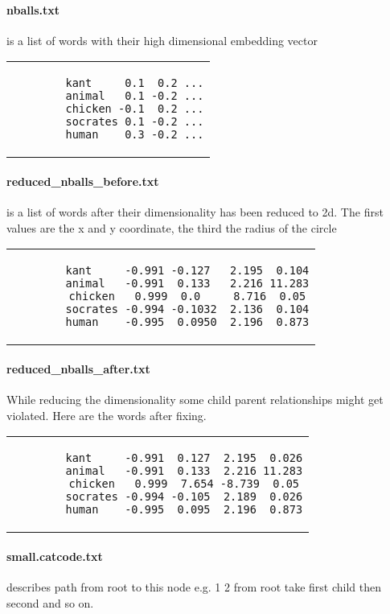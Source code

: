 \paragraph{nballs.txt} is a list of words with their high dimensional embedding vector
\begin{center}
	\begin{tabular}{c}
		\begin{lstlisting}
		kant     0.1  0.2 ...
		animal   0.1 -0.2 ...
		chicken -0.1  0.2 ...
		socrates 0.1 -0.2 ...
		human    0.3 -0.2 ...
		\end{lstlisting}
	\end{tabular}
\end{center}

\paragraph{reduced\_nballs\_before.txt} is a list of words after their dimensionality has been reduced to 2d. The first values are the x and y coordinate, the third the radius of the circle

\begin{center}
	\begin{tabular}{c}
		\begin{lstlisting}
		kant     -0.991 -0.127   2.195  0.104
		animal   -0.991  0.133   2.216 11.283
		chicken   0.999  0.0     8.716  0.05
		socrates -0.994 -0.1032  2.136  0.104
		human    -0.995  0.0950  2.196  0.873
		\end{lstlisting}
	\end{tabular}
\end{center}
\paragraph{reduced\_nballs\_after.txt} While reducing the dimensionality some child parent relationships might get violated. Here are the words after fixing.
\begin{center}
	\begin{tabular}{c}
		\begin{lstlisting}
		kant     -0.991  0.127  2.195  0.026
		animal   -0.991  0.133  2.216 11.283
		chicken   0.999  7.654 -8.739  0.05
		socrates -0.994 -0.105  2.189  0.026
		human    -0.995  0.095  2.196  0.873
		\end{lstlisting}
	\end{tabular}
\end{center}

\paragraph{small.catcode.txt} describes path from root to this node e.g. 1 2 from root take first child then second and so on.

